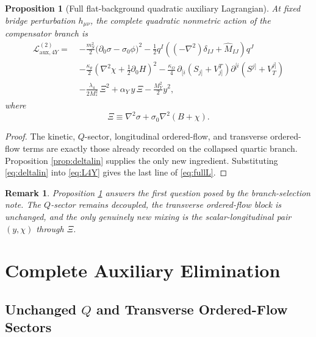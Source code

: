 \documentclass[11pt]{article}
\newtheorem{proposition}{Proposition}
\newtheorem{remark}{Remark}
\begin{document}
\begin{proposition}[Full flat-background quadratic auxiliary Lagrangian]
\label{prop:fullL}
At fixed bridge perturbation \(h_{\mu\nu}\), the complete quadratic nonmetric action of the compensator branch is
\begin{align}
\mathcal L_{\mathrm{aux},4Y}^{(2)}
=\;&
-\frac{m_S^2}{2}\bigl(\partial_0\sigma-\sigma_0\phi\bigr)^2
-\frac{1}{2}q^I\!\left((-\nabla^2)\delta_{IJ}+\widehat M_{IJ}\right)\!q^J
\nonumber\\
&-\frac{\kappa_\theta}{2}
\left(\nabla^2\chi+\frac{1}{2}\partial_0H\right)^2
-\frac{\kappa_\Omega}{4}\,
\partial_{[i}\!\left(S_{j]}+V^T_{j]}\right)
\partial^{[i}\!\left(S^{j]}+V_T^{j]}\right)
\nonumber\\
&-\frac{\lambda_4}{2M_*^2}\,\Xi^2
+\alpha_Y\,y\,\Xi
-\frac{M_Y^2}{2}y^2,
\label{eq:fullL}
\end{align}
where
\begin{equation}
\Xi
\equiv
\nabla^2\sigma+\sigma_0\nabla^2(B+\chi).
\label{eq:Xidef}
\end{equation}
\end{proposition}

\begin{proof}
The kinetic, \(Q\)-sector, longitudinal ordered-flow, and transverse ordered-flow terms are exactly those already recorded on the collapsed quartic branch. Proposition \ref{prop:deltalin} supplies the only new ingredient. Substituting \eqref{eq:deltalin} into \eqref{eq:L4Y} gives the last line of \eqref{eq:fullL}.
\end{proof}

\begin{remark}
Proposition \ref{prop:fullL} answers the first question posed by the branch-selection note. The \(Q\)-sector remains decoupled, the transverse ordered-flow block is unchanged, and the only genuinely new mixing is the scalar-longitudinal pair \((y,\chi)\) through \(\Xi\).
\end{remark}

\section{Complete Auxiliary Elimination}

\subsection{Unchanged \texorpdfstring{\(Q\)}{Q} and Transverse Ordered-Flow Sectors}
\end{document}
